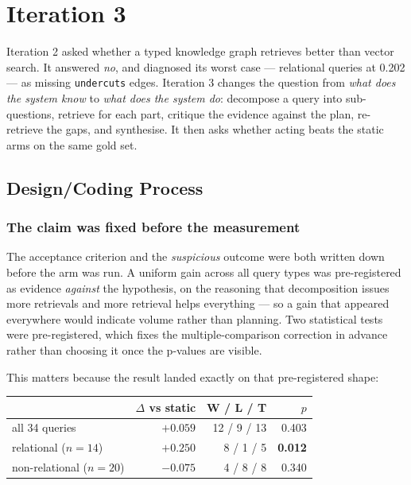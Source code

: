\section{Iteration 3}

Iteration 2 asked whether a typed knowledge graph retrieves better than
vector search. It answered \emph{no}, and diagnosed its worst case ---
relational queries at 0.202 --- as missing \texttt{undercuts} edges.
Iteration 3 changes the question from \emph{what does the system know} to
\emph{what does the system do}: decompose a query into sub-questions,
retrieve for each part, critique the evidence against the plan, re-retrieve
the gaps, and synthesise. It then asks whether acting beats the static arms
on the same gold set.

\subsection{Design/Coding Process}

\subsubsection*{The claim was fixed before the measurement}

The acceptance criterion and the \emph{suspicious} outcome were both written
down before the arm was run. A uniform gain across all query types was
pre-registered as evidence \emph{against} the hypothesis, on the reasoning
that decomposition issues more retrievals and more retrieval helps
everything --- so a gain that appeared everywhere would indicate volume
rather than planning. Two statistical tests were pre-registered, which fixes
the multiple-comparison correction in advance rather than choosing it once
the p-values are visible.

This matters because the result landed exactly on that pre-registered shape:

\begin{center}
\begin{tabular}{lrrr}
\hline
 & $\Delta$ vs static & W / L / T & $p$ \\
\hline
all 34 queries          & $+0.059$ & 12 / 9 / 13 & 0.403 \\
relational ($n=14$)     & $+0.250$ & 8 / 1 / 5   & \textbf{0.012} \\
non-relational ($n=20$) & $-0.075$ & 4 / 8 / 8   & 0.340 \\
\hline
\end{tabular}
\end{center}

